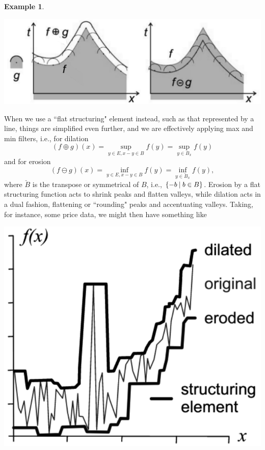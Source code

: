 \documentclass[a4paper]{book}
\theoremstyle{definition}
\newtheorem{example}{Example}[section]
\theoremstyle{definition}
\theoremstyle{definition}
\theoremstyle{theorem}
\theoremstyle{definition}
\begin{document}
\begin{example}
\begin{center}
	\includegraphics*[scale=0.25]{FunctionalDilationErosion.png}
\end{center}
When we use a ``flat structuring" element instead, such as that represented by a line, things are simplified even further, and we are effectively applying max and min filters, i.e., for dilation
\begin{equation*}
(f \oplus g)(x) = \sup_{y \in E, x-y \in B} f(y) = \sup_{y \in B_x} f(y) 
\end{equation*}
and for erosion 
\begin{equation*}
(f \ominus g)(x) = \inf_{y \in E, x-y \in B} f(y) = \inf_{y \in \breve{B}_x} f(y), 
\end{equation*}
where $\breve{B}$ is the transpose or symmetrical of $B$, i.e., $\{-b \hspace*{0.25em}|\hspace*{0.25em} b \in B\}$. Erosion by a flat structuring function acts to shrink peaks and flatten valleys, while dilation acts in a dual fashion, flattening or ``rounding" peaks and accentuating valleys. Taking, for instance, some price data, we might then have something like 
\begin{center}
	\includegraphics*[scale=0.25]{DilationPlusErosionStock.png}

\end{center}
\end{example}
\end{document}
